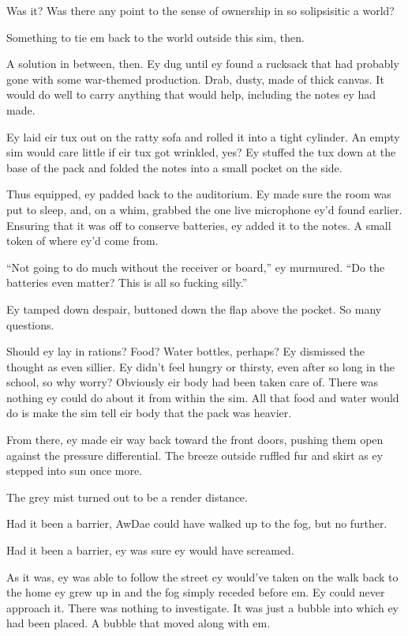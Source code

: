 Was it? Was there any point to the sense of ownership in so solipsisitic a world?

Something to tie em back to the world outside this sim, then.

A solution in between, then. Ey dug until ey found a rucksack that had probably gone with some war-themed production. Drab, dusty, made of thick canvas. It would do well to carry anything that would help, including the notes ey had made.

Ey laid eir tux out on the ratty sofa and rolled it into a tight cylinder. An empty sim would care little if eir tux got wrinkled, yes? Ey stuffed the tux down at the base of the pack and folded the notes into a small pocket on the side.

Thus equipped, ey padded back to the auditorium. Ey made sure the room was put to sleep, and, on a whim, grabbed the one live microphone ey'd found earlier. Ensuring that it was off to conserve batteries, ey added it to the notes. A small token of where ey'd come from.

``Not going to do much without the receiver or board,'' ey murmured. ``Do the batteries even matter? This is all so fucking silly.''

Ey tamped down despair, buttoned down the flap above the pocket. So many questions.

Should ey lay in rations? Food? Water bottles, perhaps? Ey dismissed the thought as even sillier. Ey didn't feel hungry or thirsty, even after so long in the school, so why worry? Obviously eir body had been taken care of. There was nothing ey could do about it from within the sim. All that food and water would do is make the sim tell eir body that the pack was heavier.

From there, ey made eir way back toward the front doors, pushing them open against the pressure differential. The breeze outside ruffled fur and skirt as ey stepped into sun once more.

The grey mist turned out to be a render distance.

Had it been a barrier, AwDae could have walked up to the fog, but no further.

Had it been a barrier, ey was sure ey would have screamed.

As it was, ey was able to follow the street ey would've taken on the walk back to the home ey grew up in and the fog simply receded before em. Ey could never approach it. There was nothing to investigate. It was just a bubble into which ey had been placed. A bubble that moved along with em.

